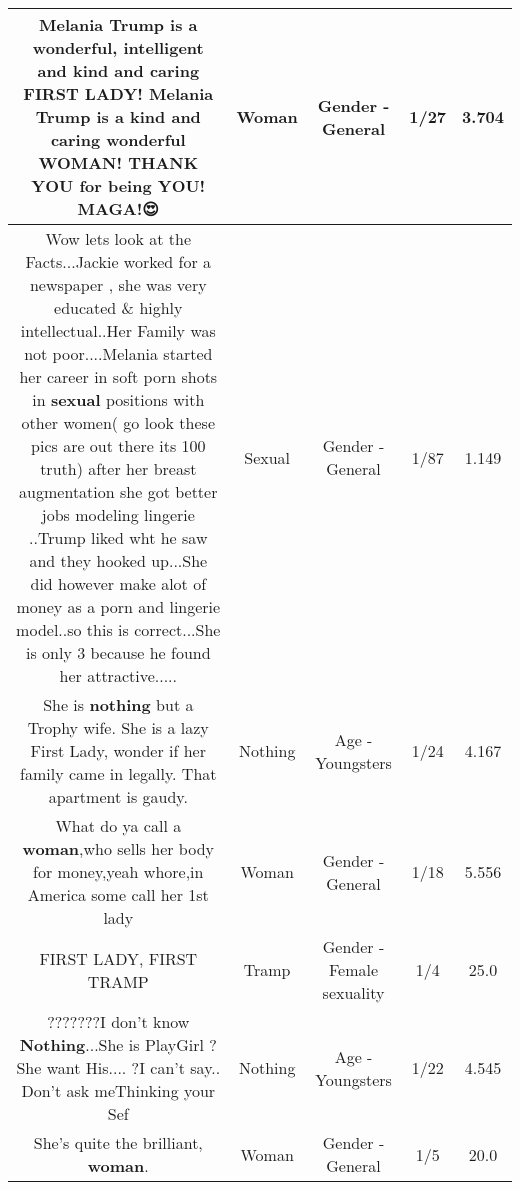 \documentclass[11pt]{article}
\newlength\mylength
\begin{document}
\begin{center}
\begin{longtable}{|C{.65\mylength}|C{.30\mylength}|C{.12\mylength}|C{.12\mylength}|C{.12\mylength}|}
  \small Melania Trump is a wonderful, intelligent and kind and caring FIRST LADY! Melania Trump is a kind and caring wonderful \textbf{WOMAN}! THANK YOU for being YOU! MAGA!😍\normalsize   & Woman & Gender - General & 1/27 & 3.704 \\  \hline
  \small Wow lets look at the Facts...Jackie worked for a newspaper , she was very educated \& highly intellectual..Her Family was not poor....Melania  started her career in soft porn shots in \textbf{sexual} positions with other women( go look these pics are out there its 100 truth) after her breast augmentation she got better jobs modeling lingerie ..Trump liked wht he saw and they hooked up...She did however make alot of money as a porn and lingerie model..so this is correct...She is only 3 because he found her attractive.....\normalsize   & Sexual & Gender - General & 1/87 & 1.149 \\  \hline
  \small She is \textbf{nothing} but a Trophy wife. She is a lazy First Lady,  wonder if her family came in legally. That apartment is gaudy.\normalsize   & Nothing & Age - Youngsters & 1/24 & 4.167 \\  \hline
  \small What do ya call a \textbf{woman},who sells her body for money,yeah whore,in America some call her 1st lady\normalsize   & Woman & Gender - General & 1/18 & 5.556 \\  \hline
  \small FIRST LADY, FIRST TRAMP\normalsize   & Tramp & Gender - Female sexuality & 1/4 & 25.0 \\  \hline
  \small ???????I don't know \textbf{Nothing}...She is PlayGirl ?She want His.... ?I can't say.. Don't ask meThinking your Sef\normalsize   & Nothing & Age - Youngsters & 1/22 & 4.545 \\  \hline
  \small She's quite the brilliant, \textbf{woman}.\normalsize   & Woman & Gender - General & 1/5 & 20.0 \\  \hline

\end{longtable}
\end{center}
\end{document}
